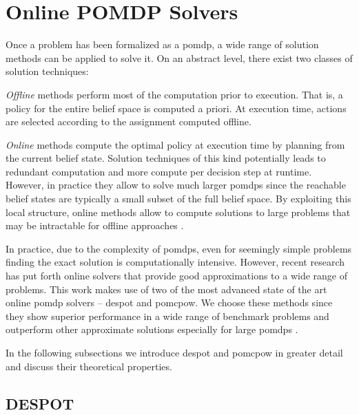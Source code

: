 \section{Online POMDP Solvers}\label{sec:online-pomdp-solvers}

Once a problem has been formalized as a \ac{pomdp}, a wide range of solution
methods can be applied to solve it. On an abstract level, there exist two classes
of solution techniques:

\emph{Offline} methods perform most of the computation prior to execution. That
is, a policy for the entire belief space is computed a priori. At execution
time, actions are selected according to the assignment computed offline.

\emph{Online} methods compute the optimal policy at execution time by planning
from the current belief state. Solution techniques of this kind potentially
leads to redundant computation and more compute per decision step at runtime.
However, in practice they allow to solve much larger \acp{pomdp} since the
reachable belief states are typically a small subset of the full belief space.
By exploiting this local structure, online methods allow to compute solutions to
large problems that may be intractable for offline approaches
\cite{kochenderfer2015decision, silver2010pomcp, somani2013despot,
kurniawati2016online}.

In practice, due to the complexity of \acp{pomdp}, even for seemingly simple
problems finding the exact solution is computationally intensive. However,
recent research has put forth online solvers that provide good approximations
to a wide range of problems. This work makes use of two of the most advanced
state of the art online \ac{pomdp} solvers -- \ac{despot} and \ac{pomcpow}. We
choose these methods since they show superior performance in a wide range of
benchmark problems and outperform other approximate solutions especially for
large \acp{pomdp} \cite{somani2013despot, sunberg2018online}.

In the following subsections we introduce \ac{despot} and \ac{pomcpow} in
greater detail and discuss their theoretical properties.

\subsection{DESPOT}\label{sec:theory-despot}

